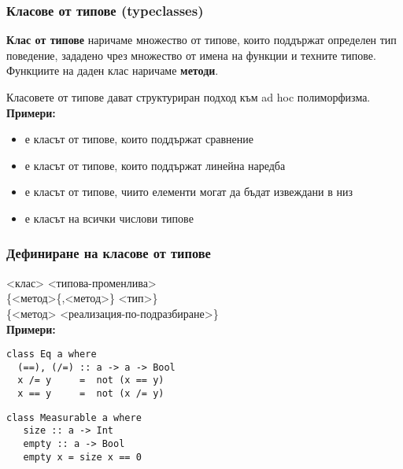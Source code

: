 \documentclass[alsotrans]{beamerswitch}
\begin{document}
\begin{frame}
  \frametitle{Класове от типове (typeclasses)}

  \begin{definition}
    \textbf{Клас от типове} наричаме множество от типове, които поддържат определен тип поведение, зададено чрез множество от имена на функции и техните типове. \pause Функциите на даден клас наричаме \textbf{методи}.
  \end{definition}
  \pause
  Класовете от типове дават структуриран подход към ad hoc полиморфизма.\\
  \pause
  \textbf{Примери:}
  \begin{itemize}[<+->]
  \item {} е класът от типове, които поддържат сравнение
  \item {} е класът от типове, които поддържат линейна наредба
  \item {} е класът от типове, чиито елементи могат да бъдат
    извеждани в низ
  \item {} е класът на всички числови типове
  \end{itemize}
\end{frame}

\begin{frame}[fragile]
  \frametitle{Дефиниране на класове от типове}
   <клас> <типова-променлива>\\
  \hspace{1em}\{<метод>\{,<метод>\} \tta{::} <тип>\}\\
  \hspace{1em}\{<метод> \tta{=} <реализация-по-подразбиране>\}\\[4ex]
  \pause
  \textbf{Примери:}\\
\begin{lstlisting}
class Eq a where
  (==), (/=) :: a -> a -> Bool
  x /= y     =  not (x == y)
  x == y     =  not (x /= y)
\end{lstlisting}
\pause
\begin{lstlisting}
class Measurable a where
   size :: a -> Int
   empty :: a -> Bool
   empty x = size x == 0
\end{lstlisting}
\end{frame}
\end{document}
